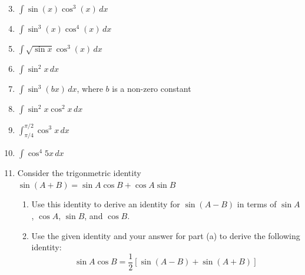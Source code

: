 \documentclass[12pt]{article}
\newif\ifans
\begin{document}
\begin{enumerate}
\setcounter{enumi}{2}

\item $\int \sin{(x)}\cos^3{(x)}\,dx$ 

\ifans{\fbox{$-\frac{1}{4}\cos^4{x}+C$}} \fi

\item $\int \sin^3{(x)}\cos^4{(x)}\,dx$ 

\ifans{\fbox{$\frac{1}{7}\cos^7{x}-\frac{1}{5}\cos^5{x}+C$}} \fi

\item $\int \sqrt{\sin{x}}\cos^{3}{(x)}\,dx$

\ifans{\fbox{$\frac{2}{3}(\sin{x})^{3/2}-\frac{2}{7}(\sin{x})^{7/2}+C$}} \fi

\item $\int \sin^2{x} \,dx$ 

\ifans{\fbox{$\frac{x}{2}-\frac{1}{4}\sin{(2x)}+C$}} \fi

\item $\int \sin^3{(bx)}\,dx$, where $b$ is a non-zero constant

\ifans{\fbox{$\frac{1}{3b}\cos^3{(bx)}-\frac{1}{b}\cos{(bx)}+C$}} \fi

\item $\int \sin^2{x}\cos^2{x}\,dx$ 

\ifans{\fbox{$\frac{x}{8}-\frac{1}{32}\sin{(4x)}+C$}} \fi

\item $\int_{\pi/4}^{\pi/2} \cos^3{x}\,dx$ 

\ifans{\fbox{$\frac{2}{3}-\frac{5\sqrt{2}}{12}$}} \fi

\item $\int \cos^4{5x}\,dx$

\ifans{\fbox{$\frac{3}{8}x+\frac{1}{20}\sin{(10x)}+\frac{1}{160}\sin{(20x)}+C$}} \fi

\item Consider the trigonmetric identity $\sin{(A+B)}=\sin{A}\cos{B}+\cos{A}\sin{B}$

\begin{enumerate}

\item Use this identity to derive an identity for $\sin{(A-B)}$ in terms of $\sin{A}$, $\cos{A}$, $\sin{B}$, and $\cos{B}$.

\ifans{\fbox{$\sin{(A-B)}=\sin{A}\cos{B}-\cos{A}\sin{B}$}} \fi

\item Use the given identity and your answer for part (a) to derive the following identity: $$\sin{A}\cos{B}=\frac{1}{2}\left[\sin{(A-B)}+\sin{(A+B)}\right]$$


\end{enumerate}
\end{enumerate}
\end{document}
